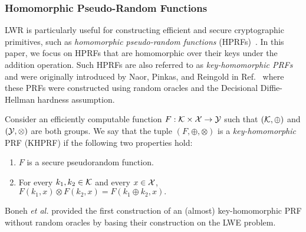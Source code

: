 \subsubsection{Homomorphic Pseudo-Random Functions}
LWR is particularly useful for constructing efficient and secure cryptographic primitives, such as \emph{homomorphic pseudo-random functions} (HPRFs)~\cite{boneh2013key}.
In this paper, we focus on HPRFs that are homomorphic over their keys under the addition operation.
Such HPRFs are also referred to as \emph{key-homomorphic PRFs} and were originally introduced by Naor, Pinkas, and Reingold in Ref.~\cite{naor1999distributed} where these PRFs were constructed using random oracles and the Decisional Diffie-Hellman hardness assumption.
\begin{definition}
	Consider an efficiently computable function $F: \mathcal{K} \times \mathcal{X} \to \mathcal{Y}$ such that $(\mathcal{K}, \oplus)$ and $(\mathcal{Y}, \otimes)$ are both groups.
	We say that the tuple $(F, \oplus, \otimes)$ is a \emph{key-homomorphic} PRF (KHPRF) if the following two properties hold:
	\begin{enumerate}
		\item $F$ is a secure pseudorandom function.
		\item For every $k_1, k_2 \in \mathcal{K}$ and every $x \in \mathcal{X}$, $F\left(k_1, x\right) \otimes F\left(k_2, x\right) = F\left(k_1 \oplus k_2, x\right).$
	\end{enumerate}
	\end{definition}

Boneh \emph{et al.} provided the first construction of an (almost) key-homomorphic PRF without random oracles by basing their construction on the LWE problem.


